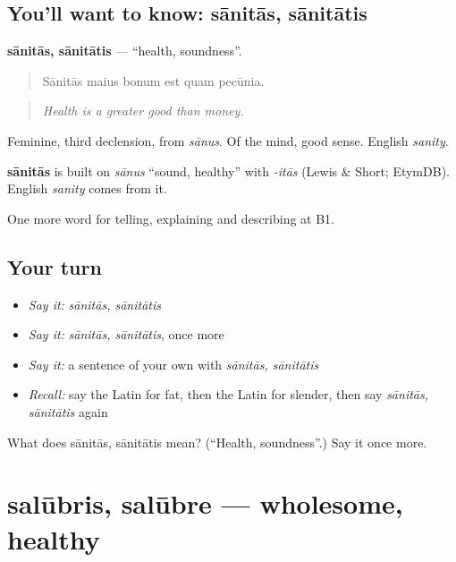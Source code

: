 \subsection*{You'll want to know: sānitās, sānitātis}
\textbf{sānitās, sānitātis} — \textquotedblleft{}health, soundness\textquotedblright{}.

\begin{quote}
Sānitās maius bonum est quam pecūnia.
\end{quote}

\begin{quote}
\emph{Health is a greater good than money.}
\end{quote}

Feminine, third declension, from \emph{sānus}. Of the mind, good sense. English \emph{sanity}.

\begin{cousinweb}
\textbf{sānitās} is built on \emph{sānus} \textquotedblleft{}sound, healthy\textquotedblright{} with \emph{-itās} (Lewis \& Short; EtymDB). English \emph{sanity} comes from it.
\end{cousinweb}

\begin{grammarlens}[title={What you've built}]
One more word for telling, explaining and describing at B1.
\end{grammarlens}

\subsection*{Your turn}
\begin{itemize}
\raggedright
  \item \emph{Say it:} \emph{sānitās, sānitātis}
  \item \emph{Say it:} \emph{sānitās, sānitātis}, once more
  \item \emph{Say it:} a sentence of your own with \emph{sānitās, sānitātis}
  \item \emph{Recall:} say the Latin for fat, then the Latin for slender, then say \emph{sānitās, sānitātis} again
\end{itemize}

\begin{tcolorbox}[breakable,colback=teal!4,colframe=teal!35!black,title={Before you move on}]
What does sānitās, sānitātis mean? (\textquotedblleft{}Health, soundness\textquotedblright{}.) Say it once more.
\end{tcolorbox}
\section[salūbris, salūbre]{salūbris, salūbre — wholesome, healthy}


